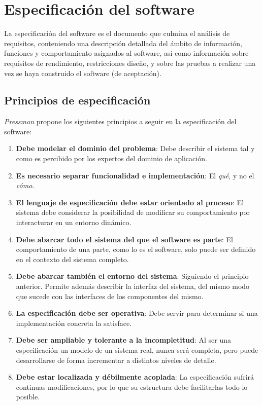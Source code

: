 \section{Especificación del software}

La especificación del software es el documento que culmina el análisis de requisitos, conteniendo una descripción detallada del ámbito de información, funciones y comportamiento asignados al software, así como información sobre requisitos de rendimiento, restricciones diseño, y sobre las pruebas a realizar una vez se haya construido el software (de aceptación).

\subsection{Principios de especificación}

\textit{Pressman} propone los siguientes principios a seguir en la especificación del software:

\begin{enumerate}
    \item \textbf{Debe modelar el dominio del problema}: Debe describir el sistema tal y como es percibido por los expertos del dominio de aplicación.
    \item \textbf{Es necesario separar funcionalidad e implementación}: El \textit{qué}, y no el \textit{cómo}.
    \item \textbf{El lenguaje de especificación debe estar orientado al proceso}: El sistema debe considerar la posibilidad de modificar su comportamiento por interacturar en un entorno dinámico.
    \item \textbf{Debe abarcar todo el sistema del que el software es parte}: El comportamiento de una parte, como lo es el software, solo puede ser definido en el contexto del sistema completo.
    \item \textbf{Debe abarcar también el entorno del sistema}: Siguiendo el principio anterior. Permite además describir la interfaz del sistema, del mismo modo que sucede con las interfaces de los componentes del mismo.
    \item \textbf{La especificación debe ser operativa}: Debe servir para determinar si una implementación concreta la satisface.
    \item \textbf{Debe ser ampliable y tolerante a la incompletitud}: Al ser una especificación un modelo de un sistema real, nunca será completa, pero puede desarrollarse de forma incrementar a distintos niveles de detalle.
    \item \textbf{Debe estar localizada y débilmente acoplada}: La especificación sufrirá continuas modificaciones, por lo que su estructura debe facilitarlas todo lo posible. 
\end{enumerate}

